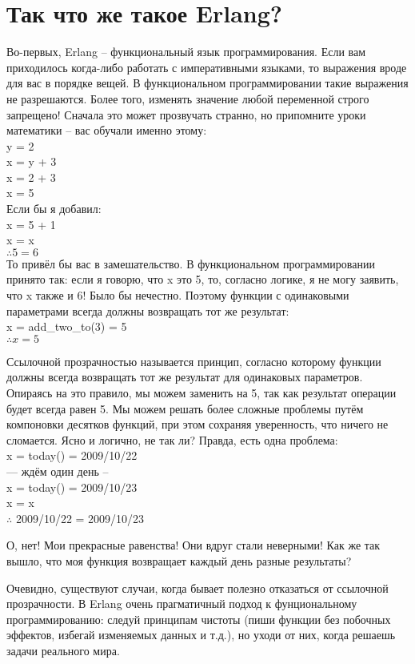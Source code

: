 \section{Так что же такое Erlang?}
Во\--первых, Erlang \--- функциональный язык программирования.
Если вам приходилось когда\--либо работать с императивными языками, то выражения вроде  для вас в порядке вещей.
В функциональном программировании такие выражения не разрешаются.
Более того, изменять значение любой переменной строго запрещено!
Сначала это может прозвучать странно, но припомните уроки математики \--- вас обучали именно этому:\\ 
y = 2\\ 
x = y + 3\\ 
x = 2 + 3\\ 
x = 5\\ 
Если бы я добавил:\\ 
x = 5 + 1\\ 
x = x\\ 
$\therefore 5 = 6$\\ 

То привёл бы вас в замешательство.
В функциональном программировании принято так: если я говорю, что x это 5, то, согласно логике, я не могу заявить, что x также и 6!
Было бы нечестно.
Поэтому функции с одинаковыми параметрами всегда должны возвращать тот же результат:\\  
x = add\_two\_to(3) = 5\\ 
$\therefore x = 5$
 
Ссылочной прозрачностью называется принцип, согласно которому функции должны всегда возвращать тот же результат для одинаковых параметров.
Опираясь на это правило, мы можем заменить  на 5, так как результат операции  будет всегда равен 5.
Мы можем решать более сложные проблемы путём компоновки десятков функций, при этом сохраняя уверенность, что ничего не сломается.
Ясно и логично, не так ли?
Правда, есть одна проблема:\\ 
x = today() = 2009/10/22\\ 
--- ждём один день --\\ 
x = today() = 2009/10/23\\ 
x = x\\ 
$\therefore$ 2009/10/22 = 2009/10/23 

О, нет!
Мои прекрасные равенства!
Они вдруг стали неверными!
Как же так вышло, что моя функция возвращает каждый день разные результаты?

Очевидно, существуют случаи, когда бывает полезно отказаться от ссылочной прозрачности.
В Erlang очень прагматичный подход к фунциональному программированию: следуй принципам чистоты (пиши функции без побочных эффектов, избегай изменяемых данных и т.д.), но уходи от них, когда решаешь задачи реального мира.

